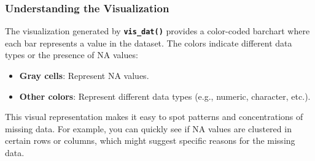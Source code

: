 \documentclass[
]{book}
\providecommand{\tightlist}{%
  \setlength{\itemsep}{0pt}\setlength{\parskip}{0pt}}
\begin{document}
\hypertarget{understanding-the-visualization}{%
\subsubsection*{Understanding the Visualization}\label{understanding-the-visualization}}

The visualization generated by \textbf{\texttt{vis\_dat()}} provides a color-coded barchart where each bar represents a value in the dataset. The colors indicate different data types or the presence of NA values:

\begin{itemize}
\tightlist
\item
  \textbf{Gray cells}: Represent NA values.
\item
  \textbf{Other colors}: Represent different data types (e.g., numeric, character, etc.).
\end{itemize}

This visual representation makes it easy to spot patterns and concentrations of missing data. For example, you can quickly see if NA values are clustered in certain rows or columns, which might suggest specific reasons for the missing data.

  
\end{document}
